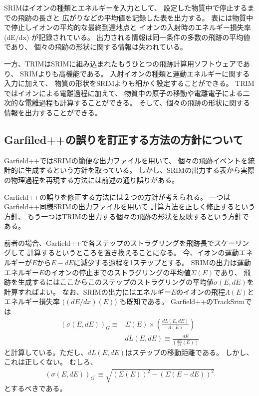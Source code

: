 \documentclass [11pt,a4paper,dvipdfmx] {jarticle}
\begin{document}
SRIMはイオンの種類とエネルギーを入力として、
設定した物質中で停止するまでの飛跡の長さと
広がりなどの平均値を記録した表を出力する。
表には物質中で停止しイオンの平均的な最終到達地点と
イオンの入射時のエネルギー損失率 (dE/dx) が記録されている。
出力される情報は同一条件の多数の飛跡の平均値であり、
個々の飛跡の形状に関する情報は失われている。

一方、TRIMはSRIMに組み込まれたもうひとつの飛跡計算用ソフトウェアであり、
SRIMよりも高機能である。
入射イオンの種類と運動エネルギーに関する入力に加えて、
物質の形状をSRIMよりも細かく設定することができる。
TRIMではイオンによる電離過程に加えて、
物質中の原子の移動や電離電子による二次的な電離過程も計算することができる。
そして、個々の飛跡の形状に関する情報を出力することができる。

\subsection{Garfiled++の誤りを訂正する方法の方針について}

Garfield++ではSRIMの簡便な出力ファイルを用いて、
個々の飛跡イベントを統計的に生成するという方針を取っている。
しかし、SRIMの出力する表から実際の物理過程を再現する方法には前述の通り誤りがある。

Garfield++の誤りを修正する方法には２つの方針が考えられる。
一つはGarfield++同様SRIMの出力ファイルを用いて
計算方法を正しく修正するという方針、
もう一つはTRIMの出力する個々の飛跡の形状を反映するという方針である。

前者の場合、Garfield++で各ステップのストラグリングを飛跡長でスケーリングして
計算するというところを置き換えることになる。
今、イオンの運動エネルギーが$E$から$E-dE$に減少する過程を1ステップとする。
SRIMの出力は運動エネルギー$E$のイオンの停止までのストラグリングの平均値$\Sigma(E)$であり、
飛跡を生成するにはここからこのステップのストラグリングの平均値$\sigma(E,dE)$を計算すればよい。
なお、SRIMの出力にはエネルギー$E$のイオンの飛程$\Lambda(E)$と
エネルギー損失率 ($\left(dE/dx\right)(E)$) も既知である。
Garfield++のTrackSrimでは
\begin{eqnarray}
    \left(\sigma(E,dE)\right)_{G} \equiv& \Sigma(E) \times \left(\frac{dL(E,dE)}{\Lambda(E)} \right) \\
        &  dL(E,dE) \equiv \frac{dE}{\left(\frac{dE}{dx}(E)\right)}　\nonumber
\end{eqnarray}
と計算している。ただし、$dL(E,dE)$はステップの移動距離である。
しかし、これは正しくない。
むしろ、
\begin{eqnarray}
    \left(\sigma(E,dE)\right)_{G^{\prime}} \equiv \sqrt{\left(\Sigma(E)\right)^2 - \left(\Sigma(E-dE)\right)^2} 
\end{eqnarray}
とするべきである。
\end{document}
